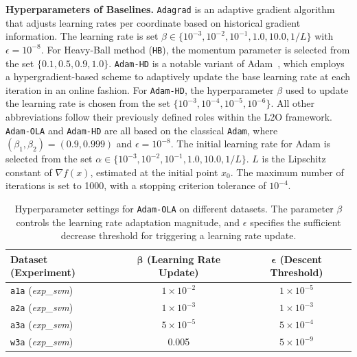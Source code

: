 \documentclass{article}
\begin{document}
\textbf{Hyperparameters of Baselines.}
\texttt{Adagrad} is an adaptive gradient algorithm that adjusts learning rates per coordinate based on historical gradient information. The learning rate is set $\beta\in \{10^{-3}, 10^{-2}, 10^{-1}, 1.0, 10.0, 1 / L\}$ with $\epsilon = 10^{-8}$. For Heavy-Ball method (\texttt{HB}), the momentum parameter is selected from the set $\{0.1, 0.5, 0.9, 1.0\}$. \texttt{Adam-HD} is a notable variant of Adam~\cite{atilim2018online}, which employs a hypergradient-based scheme to adaptively update the base learning rate at each iteration in an online fashion. For \texttt{Adam-HD}, the hyperparameter $\beta$ used to update the learning rate is chosen from the set $\{10^{-3}, 10^{-4}, 10^{-5}, 10^{-6}\}$. All other abbreviations follow their previously defined roles within the L2O framework. \texttt{Adam-OLA} and \texttt{Adam-HD} are all based on the classical \texttt{Adam}, where $(\beta_1,\beta_2) = (0.9,0.999)$ and $\epsilon = 10^{-8}$. The initial learning rate for Adam is selected from the set $\alpha \in \{10^{-3}, 10^{-2}, 10^{-1}, 1.0, 10.0, 1 / L\}$. $L$ is the Lipschitz constant of $\nabla f(x)$, estimated at the initial point $x_0$. The maximum number of iterations is set to 1000, with a stopping criterion tolerance of $10^{-4}$.
\begin{table}[H]
\centering
\caption{Hyperparameter settings for \texttt{Adam-OLA} on different datasets. The parameter $\beta$ controls the learning rate adaptation magnitude, and $\epsilon$ specifies the sufficient decrease threshold for triggering a learning rate update.}
\label{tab:adam_ola_params}
\begin{tabular}{lcc}
\toprule
\textbf{Dataset (Experiment)} & $\boldsymbol{\beta}$ (Learning Rate Update) & $\boldsymbol{\epsilon}$ (Descent Threshold) \\
\midrule
\texttt{a1a} (\textit{exp\_svm})        & $1 \times 10^{-2}$  & $1 \times 10^{-5}$ \\
\texttt{a2a} (\textit{exp\_svm})        & $1 \times 10^{-3}$ & $1 \times 10^{-3}$ \\
\texttt{a3a} (\textit{exp\_svm})        & $5 \times 10^{-5}$ & $5 \times 10^{-4}$ \\
\texttt{w3a} (\textit{exp\_svm})        & 0.005   & $5 \times 10^{-9}$
\\
\bottomrule
\end{tabular}
\end{table}
\end{document}
